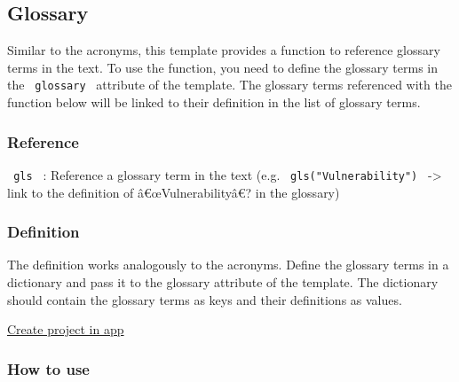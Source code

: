\subsection{Glossary}\label{glossary}

Similar to the acronyms, this template provides a function to reference
glossary terms in the text. To use the function, you need to define the
glossary terms in the \texttt{\ glossary\ } attribute of the template.
The glossary terms referenced with the function below will be linked to
their definition in the list of glossary terms.

\subsubsection{Reference}\label{reference}

\texttt{\ gls\ } : Reference a glossary term in the text (e.g.
\texttt{\ gls("Vulnerability")\ } -\textgreater{} link to the definition
of â€œVulnerabilityâ€? in the glossary)

\subsubsection{Definition}\label{definition-1}

The definition works analogously to the acronyms. Define the glossary
terms in a dictionary and pass it to the glossary attribute of the
template. The dictionary should contain the glossary terms as keys and
their definitions as values.

\begin{Shaded}
\begin{Highlighting}[]
\NormalTok{)}
\end{Highlighting}
\end{Shaded}

\href{/app?template=supercharged-dhbw&version=3.3.2}{Create project in
app}

\subsubsection{How to use}\label{how-to-use}

